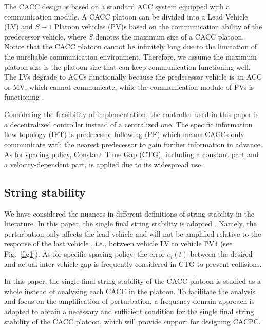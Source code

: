 \documentclass[trsc,nonblindrev]{informs3} %
\begin{document}
The CACC design is based on a standard ACC system equipped with a communication module. A CACC platoon can be divided into a Lead Vehicle (LV) and $S-1$ Platoon vehicles (PV)s based on the communication ability of the predecessor vehicle, where $S$ denotes the maximum size of a CACC platoon. Notice that the CACC platoon cannot be infinitely long due to the limitation of the unreliable communication environment. Therefore, we assume the maximum platoon size is the platoon size that can keep communication functioning well. The LVs degrade to ACCs functionally because the predecessor vehicle is an ACC or MV, which cannot communicate, while the communication module of PVs is functioning \citep{dey2015review,navas2019mixing}.

Considering the feasibility of implementation, the controller used in this paper is a decentralized controller instead of a centralized one. The specific information flow topology (IFT) is predecessor following (PF) which means CACCs only communicate with the nearest predecessor to gain further information in advance. As for spacing policy, Constant Time Gap (CTG), including a constant part and a velocity-dependent part, is applied due to its widespread use.

\subsection{String stability}
\label{Section 2.2}

We have considered the nuances in different definitions of string stability in the literature. In this paper, the single final string stability is adopted \citep{studli2017vehicular}. Namely, the perturbation only affects the lead vehicle and will not be amplified relative to the response of the last vehicle \citep{qin2021analytical,montanino2021homogeneous,jin2014dynamics,zhou2020stabilizing,wang2018infrastructure}, i.e., between vehicle LV to vehicle PV4 (see Fig.~\ref{fig1}). As for specific spacing policy, the error $e_i (t)$ between the desired and actual inter-vehicle gap is frequently considered in CTG to prevent collisions.

In this paper, the single final string stability of the CACC platoon is studied as a whole instead of analyzing each CACC in the platoon. To facilitate the analysis and focus on the amplification of perturbation, a frequency-domain approach is adopted to obtain a necessary and sufficient condition for the single final string stability of the CACC platoon, which will provide support for designing CACPC.
\end{document}
